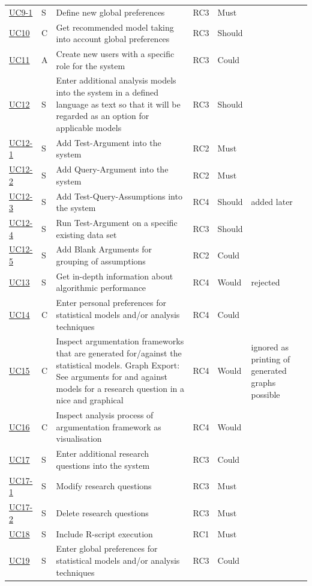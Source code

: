 \begin{landscape}
\begin{longtable}{ l l p{11cm} l l p{3cm} }
		\href{https://trello.com/c/Ca9mA3uA}{UC9-1}   &   S & 	Define new global preferences & RC3 & Must &   \\
		\href{https://trello.com/c/1s656fA9}{UC10}  &   C & 	Get recommended model taking into account global preferences & RC3 & Should & 	 \\
		\href{https://trello.com/c/xUDStSOK}{UC11}  &   A & 	Create new users with a specific role for the system & RC3 & Could &    \\
		\href{https://trello.com/c/5UMo7o6U}{UC12}  &   S & 	Enter additional analysis models into the system in a defined language as text so that it will be regarded as an option for applicable models	& RC3 & Should & \\
		\href{https://trello.com/c/2V6Cl65u}{UC12-1}&   S & 	Add Test-Argument into the system & RC2 & Must & \\
		\href{https://trello.com/c/OwM2Z7wt}{UC12-2}&   S & 	Add Query-Argument into the system & RC2 & Must &  \\
		\href{https://trello.com/c/VThxB5aS}{UC12-3}&   S & 	Add Test-Query-Assumptions into the system & RC4 & Should & added later\\
		\href{https://trello.com/c/CkpJUNPW}{UC12-4}&   S & 	Run Test-Argument on a specific existing data set & RC3	& Should &  \\
		\href{https://trello.com/c/Rg6GPnNE}{UC12-5}&   S & 	Add Blank Arguments for grouping of assumptions & RC2 & Could & \\
		\href{https://trello.com/c/ORlMByiQ}{UC13}  &   S & 	Get in-depth information about algorithmic performance & RC4 & Would & rejected\\
		\href{https://trello.com/c/NcV3lo4w}{UC14}  &   C & 	Enter personal preferences for statistical models and/or analysis techniques & RC4 & Could &   \\
		\href{https://trello.com/c/BOUu2hKN}{UC15}  &   C & 	Inspect argumentation frameworks that are generated for/against the statistical models. Graph Export: See arguments for and against models for a research question in a nice and graphical &RC4 & Would & 	 ignored as printing of generated graphs possible  \\
		\href{https://trello.com/c/3FCcFdmm}{UC16}  &   C & 	Inspect analysis process of argumentation framework as visualisation & RC4 & Would	&    \\
		\href{https://trello.com/c/Hv2xe2UW}{UC17}  &   S & 	Enter additional research questions into the system & RC3 &Could& \\
		\href{https://trello.com/c/w1YiIgU7}{UC17-1}&   S & 	Modify research questions&RC3 & Must &  \\
		\href{https://trello.com/c/UbT5mtDx}{UC17-2}&   S & 	Delete research questions&RC3&Must& \\
		\href{https://trello.com/c/dpLHOxbB}{UC18}  &   S & 	Include R-script execution	 & RC1 & Must & \\
		\href{https://trello.com/c/bZHdWpkt}{UC19}  &   S & 	Enter global preferences for statistical models and/or analysis techniques& RC3 & Could &	 \\


\end{longtable}
\end{landscape}

